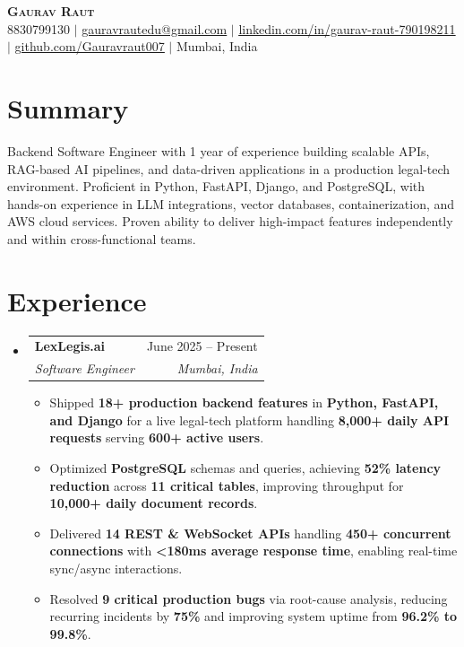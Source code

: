 \documentclass[letterpaper,11pt]{article}
\makeatletter
\newcommand{\resumeItem}[1]{
  \item\small{
    {#1 \vspace{-2pt}}
  }
}
\newcommand{\resumeSubheading}[4]{
  \vspace{-2pt}\item
    \begin{tabular*}{0.97\textwidth}[t]{l@{\extracolsep{\fill}}r}
      \textbf{#1} & #2 \\
      \textit{\small#3} & \textit{\small #4} \\
    \end{tabular*}\vspace{-7pt}
}
\newcommand{\resumeSubHeadingListStart}{\begin{itemize}[leftmargin=0.15in, label={}]}
\newcommand{\resumeSubHeadingListEnd}{\end{itemize}}
\newcommand{\resumeItemListStart}{\begin{itemize}}
\newcommand{\resumeItemListEnd}{\end{itemize}\vspace{-5pt}}
\makeatother
\begin{document}
\begin{center}
    \textbf{\Huge \scshape Gaurav Raut} \\ \vspace{1pt}
    \small 8830799130 $|$
    \href{mailto:gauravrautedu@gmail.com}{\underline{gauravrautedu@gmail.com}} $|$
    \href{https://linkedin.com/in/gaurav-raut-790198211}{\underline{linkedin.com/in/gaurav-raut-790198211}} $|$
    \href{https://github.com/Gauravraut007}{\underline{github.com/Gauravraut007}} $|$
    Mumbai, India
\end{center}

\section{Summary}
\small{
Backend Software Engineer with 1 year of experience building scalable APIs, RAG-based AI pipelines, and data-driven applications in a production legal-tech environment. Proficient in Python, FastAPI, Django, and PostgreSQL, with hands-on experience in LLM integrations, vector databases, containerization, and AWS cloud services. Proven ability to deliver high-impact features independently and within cross-functional teams.
}
\vspace{-2pt}

\section{Experience}
  \resumeSubHeadingListStart
    \resumeSubheading
      {LexLegis.ai}{June 2025 -- Present}
      {Software Engineer}{Mumbai, India}
      \resumeItemListStart
          \resumeItem{Shipped \textbf{18+ production backend features} in \textbf{Python, FastAPI, and Django} for a live legal-tech platform handling \textbf{8,000+ daily API requests} serving \textbf{600+ active users}.}
          \resumeItem{Optimized \textbf{PostgreSQL} schemas and queries, achieving \textbf{52\% latency reduction} across \textbf{11 critical tables}, improving throughput for \textbf{10,000+ daily document records}.}
          \resumeItem{Delivered \textbf{14 REST \& WebSocket APIs} handling \textbf{450+ concurrent connections} with \textbf{<180ms average response time}, enabling real-time sync/async interactions.}
          \resumeItem{Resolved \textbf{9 critical production bugs} via root-cause analysis, reducing recurring incidents by \textbf{75\%} and improving system uptime from \textbf{96.2\% to 99.8\%}.}
      \resumeItemListEnd
  \resumeSubHeadingListEnd
\end{document}

